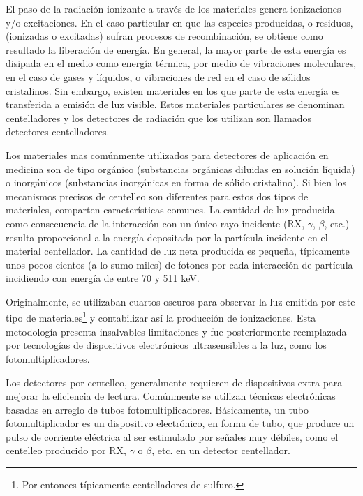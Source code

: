 %
El paso de la radiaci\'on ionizante a trav\'es de los materiales genera ionizaciones y/o excitaciones. En el caso particular en que las 
especies producidas, 
o residuos,
(ionizadas o excitadas) sufran procesos de recombinaci\'on, se obtiene como resultado la liberaci\'on de energ\'ia. En general, la mayor 
parte de esta energ\'ia 
es disipada en el medio como energ\'ia t\'ermica, por medio de vibraciones moleculares, en el caso de gases y l\'iquidos, o vibraciones de 
red en el caso de 
s\'olidos cristalinos. Sin embargo, existen materiales en los que parte de esta energ\'ia es transferida a emisi\'on de luz visible. Estos 
materiales 
particulares se denominan centelladores y los detectores de radiaci\'on que los utilizan son llamados detectores centelladores.
%

%
Los materiales mas com\'unmente utilizados para detectores de aplicaci\'on en medicina son de tipo org\'anico (substancias org\'anicas 
diluidas en soluci\'on 
l\'iquida) o inorg\'anicos (substancias inorg\'anicas en forma de s\'olido cristalino). Si bien los mecanismos precisos de centelleo son 
diferentes para estos 
dos tipos de materiales, comparten caracter\'isticas comunes. La cantidad de luz producida como consecuencia  de la interacci\'on con un 
\'unico rayo incidente 
(RX, $\gamma$, $\beta$, etc.) resulta proporcional a la energ\'ia depositada por la part\'icula incidente en el material centellador. La 
cantidad de luz neta 
producida es peque\~na, t\'ipicamente unos pocos cientos (a lo sumo miles) de fotones por cada interacci\'on de part\'icula incidiendo 
con energ\'ia de 
entre 70 y 511 keV.
%

%
Originalmente, se utilizaban cuartos oscuros para observar la luz emitida por este tipo de materiales\footnote{Por entonces t\'ipicamente 
centelladores de 
sulfuro.} y contabilizar as\'i la producci\'on de ionizaciones. Esta metodolog\'ia presenta insalvables limitaciones y fue posteriormente 
reemplazada por 
tecnolog\'ias de dispositivos electr\'onicos ultrasensibles a la luz, como los fotomultiplicadores.
%

%
Los detectores por centelleo, generalmente requieren de dispositivos extra para mejorar la eficiencia de lectura. Com\'unmente se utilizan 
t\'ecnicas 
electr\'onicas basadas en arreglo de tubos fotomultiplicadores. 
B\'asicamente, un tubo fotomultiplicador es un dispositivo electr\'onico, en forma de tubo, que produce un pulso  de corriente el\'ectrica 
al ser estimulado 
por se\~nales muy d\'ebiles, como el centelleo producido por RX,  $\gamma$ o $\beta$, etc. en un detector centellador. 
%

